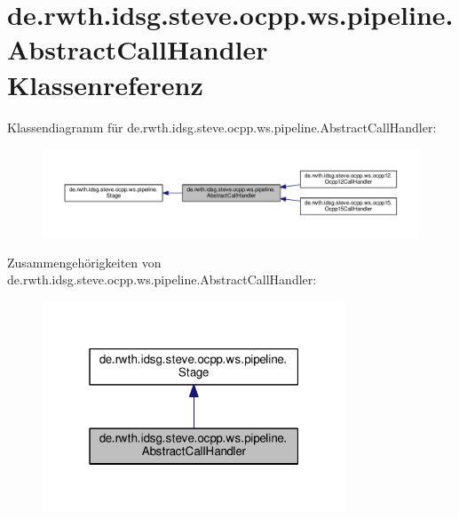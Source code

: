 \hypertarget{classde_1_1rwth_1_1idsg_1_1steve_1_1ocpp_1_1ws_1_1pipeline_1_1_abstract_call_handler}{\section{de.\+rwth.\+idsg.\+steve.\+ocpp.\+ws.\+pipeline.\+Abstract\+Call\+Handler Klassenreferenz}
\label{classde_1_1rwth_1_1idsg_1_1steve_1_1ocpp_1_1ws_1_1pipeline_1_1_abstract_call_handler}
}


Klassendiagramm für de.\+rwth.\+idsg.\+steve.\+ocpp.\+ws.\+pipeline.\+Abstract\+Call\+Handler\+:\nopagebreak
\begin{figure}[H]
\begin{center}
\leavevmode
\includegraphics[width=350pt]{classde_1_1rwth_1_1idsg_1_1steve_1_1ocpp_1_1ws_1_1pipeline_1_1_abstract_call_handler__inherit__graph}
\end{center}
\end{figure}


Zusammengehörigkeiten von de.\+rwth.\+idsg.\+steve.\+ocpp.\+ws.\+pipeline.\+Abstract\+Call\+Handler\+:\nopagebreak
\begin{figure}[H]
\begin{center}
\leavevmode
\includegraphics[width=256pt]{classde_1_1rwth_1_1idsg_1_1steve_1_1ocpp_1_1ws_1_1pipeline_1_1_abstract_call_handler__coll__graph}
\end{center}
\end{figure}
